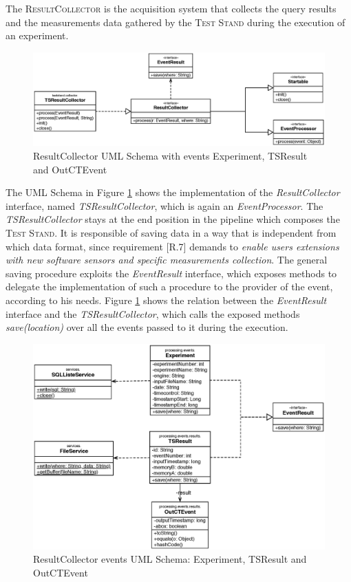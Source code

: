 \noindent The \textsc{ResultCollector} is the acquisition system that collects the query results and the measurements data gathered by the \textsc{Test Stand} during the execution of an experiment.

\begin{figure}[tbh]
  \centering
	\includegraphics[width=\linewidth]{images/uml_resultcollector}
	\caption{ResultCollector UML Schema with events Experiment, TSResult and OutCTEvent} 
  	\label{fig:uml_resultcollector}
\end{figure}

The UML Schema in Figure \ref{fig:uml_resultcollector} shows the implementation of the \textit{ResultCollector} interface, named \textit{TSResultCollector}, which is again an \textit{EventProcessor}. The \textit{TSResultCollector} stays at the end position in the pipeline which composes the \textsc{Test Stand}. It is responsible of saving data in a way that is independent from which data format, since requirement [R.7] demands to \textit{enable users extensions with new software sensors and specific measurements collection}.  The general saving procedure exploits the \textit{EventResult} interface, which exposes methods to delegate the implementation of such a procedure to the provider of the event, according to his needs. Figure \ref{fig:uml_resultcollector} shows the relation between the \textit{EventResult} interface and the \textit{TSResultCollector}, which calls the exposed methods \textit{save(location)} over all the events passed to it during the execution. 


\begin{figure}[tbh]
  \centering
	\includegraphics[width=\linewidth]{images/uml_resultcollector_events}
	\caption{ResultCollector events  UML Schema: Experiment, TSResult and OutCTEvent} 
  	\label{fig:uml_resultcollector_events}
\end{figure}

